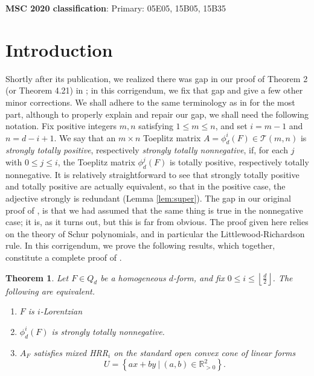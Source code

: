 \documentclass[unnumsec,webpdf,modern,medium]{oup-authoring-template}
\newcommand{\R}{\mathbb{R}}
\newcommand{\flo}[1]{\left\lfloor\frac{#1}{2}\right\rfloor}
\theoremstyle{theorem}
\newtheorem{theorem}{Theorem}[section]
\theoremstyle{definition}
\begin{document}
\maketitle


\textbf{MSC 2020 classification}: Primary: 05E05, 15B05, 15B35


\section{Introduction}
Shortly after its publication, we realized there was gap in our proof of Theorem 2 (or Theorem 4.21) in \cite{MMS}; in this corrigendum, we fix that gap and give a few other minor corrections.  We shall adhere to the same terminology as in \cite{MMS} for the most part, although to properly explain and repair our gap, we shall need the following notation. Fix positive integers $m,n$ satisfying $1\leq m\leq n$, and set $i=m-1$ and $n=d-i+1$.  We say that an $m\times n$ Toeplitz matrix $A=\phi^i_d(F)\in\mathcal{T}(m,n)$
is \emph{strongly totally positive}, respectively \emph{strongly totally nonnegative}, if, for each $j$ with $0\leq j\leq i$,  the Toeplitz matrix $\phi^j_d(F)$ is totally positive, respectively totally nonnegative.  %
It is relatively straightforward to see that strongly totally positive and totally positive are actually equivalent, so that in the positive case, the adjective strongly is redundant (Lemma \ref{lem:super}).  The gap in our original proof of \cite[Theorem 4.21]{MMS}, is that we had assumed that the same thing is true in the nonnegative case; it is, as it turns out, but this is far from obvious.  The proof given here relies on the theory of Schur polynomials, and in particular the Littlewood-Richardson rule.
In this corrigendum, we prove the following results, which together, constitute a complete proof of \cite[Theorem 4.21]{MMS}.
\begin{theorem}
	\label{thm:Lorentzian2}
	Let $F\in Q_d$ be a homogeneous $d$-form, and fix $0\leq i\leq \flo{d}$.	The following are equivalent.
	\begin{enumerate}
		\item $F$ is $i$-Lorentzian
		\item $\phi^i_d(F)$ is strongly totally nonnegative.
		\item $A_F$ satisfies mixed HRR$_i$ on the standard open convex cone of linear forms
		$$U=\left\{ax+by \ | \ (a,b)\in\R^2_{>0}\right\}.$$
	\end{enumerate}
\end{theorem} 	
\end{document}
